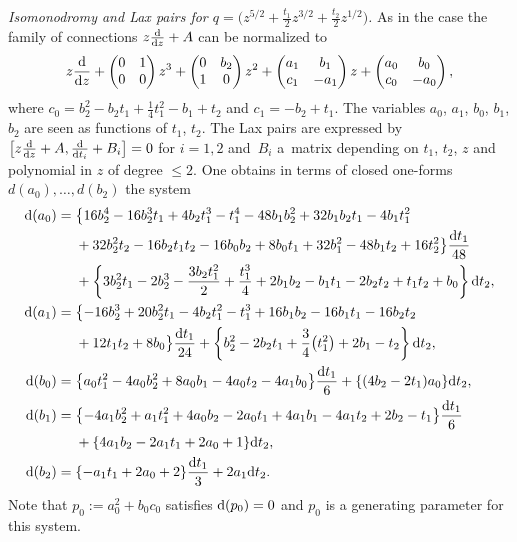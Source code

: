 \documentclass[10pt,a4paper]{amsart}
\numberwithin{equation}{section}
\begin{document}
{\it Isomonodromy and Lax pairs for $q=\bigl(z^{5/2}+\frac{t_1}{2}z^{3/2}+\frac{t_2}{2}z^{1/2}\bigr)$.}
As in the case  the family of connections $z\frac{{\rm d}}{{\rm d}z}+A$ can be normalized to
\[ z\frac{{\rm d}}{{\rm d}z}+ \begin{pmatrix} 0 & 1 \\ 0& 0\end{pmatrix} z^3+
\begin{pmatrix} 0 & b_2 \\ 1& 0\end{pmatrix} z^2+
\begin{pmatrix} a_1 &b_1 \\ c_1& -a_1\end{pmatrix} z+ \begin{pmatrix} a_0 & b_0
 \\ c_0& -a_0\end{pmatrix},\]
where $c_0=b_2^2-b_2t_1+\frac{1}{4}t_1^2-b_1+t_2$ and $c_1=-b_2+t_1$.
The variables $a_0$, $a_1$, $b_0$, $b_1$, $b_2$ are seen as functions of $t_1$, $t_2$. The Lax pairs are expressed
by $\bigl[z\frac{{\rm d}}{{\rm d}z}+A, \frac{{\rm d}}{{\rm d}t_i}+B_i\bigr]=0$ for $i=1,2$ and~$B_i$ a~matrix depending on $t_1$, $t_2$, $z$ and polynomial in $z$
of degree $\leq 2$. One obtains in terms of closed one-forms $d(a_0),\dots ,d(b_2)$ the system
\begin{align*}
{\rm d}(a_0)={} &\bigl\{16b_2^4-16b_2^3t_1+4b_2t_1^3-t_1^4-48b_1b_2^2+32b_1b_2t_1-4b_1t_1^2\\
&+32b_2^2t_2-16b_2t_1t_2-16b_0b_2+
 8b_0t_1+32b_1^2-48b_1t_2+16t_2^2 \bigr\} \frac{{\rm d}t_1}{48} \\
 & +\left\{3b_2^2t_1 -2b_2^3 -\frac{3b_2t_1^2}{2}+\frac{t_1^3}{4}+2b_1b_2 -b_1t_1 -2b_2t_2+t_1t_2+b_0 \right\} {\rm d}t_2, \\
{\rm d}(a_1)={} &\bigl\{
 -16b_2^3+20b_2^2t_1-4b_2t_1^2-t_1^3+16b_1b_2-16b_1t_1-16b_2t_2\\ &+12t_1t_2+8b_0\bigr\}\frac{{\rm d}t_1}{24} +
 \left\{b_2^2-2b_2t_1+\frac{3}{4}\bigl(t_1^2\bigr)+2b_1-t_2 \right\} {\rm d}t_2, \\
{\rm d}(b_0)={} &\bigl\{a_0t_1^2-4a_0b_2^2+8a_0b_1-4a_0t_2-4a_1b_0\bigr\}\frac{{\rm d}t_1}{6}+\{ (4b_2-2t_1)a_0 \}{\rm d}t_2, \\
{\rm d}(b_1)={} &\bigl\{ -4a_1b_2^2+a_1t_1^2+4a_0b_2-2a_0t_1+4a_1b_1-4a_1t_2+2b_2-t_1\bigr\} \frac{{\rm d}t_1}{6}\\
 &+\{ 4a_1b_2-2a_1t_1+2a_0+1 \} {\rm d}t_2,\\
 {\rm d}(b_2)={} & \{ -a_1t_1+2a_0+2\}\frac{{\rm d}t_1}{3}+2a_1{\rm d}t_2.\end{align*}
Note that $p_0:=a_0^2+b_0c_0$ satisfies ${\rm d}(p_0)=0$ and $p_0$ is a generating parameter for this system.
\end{document}
